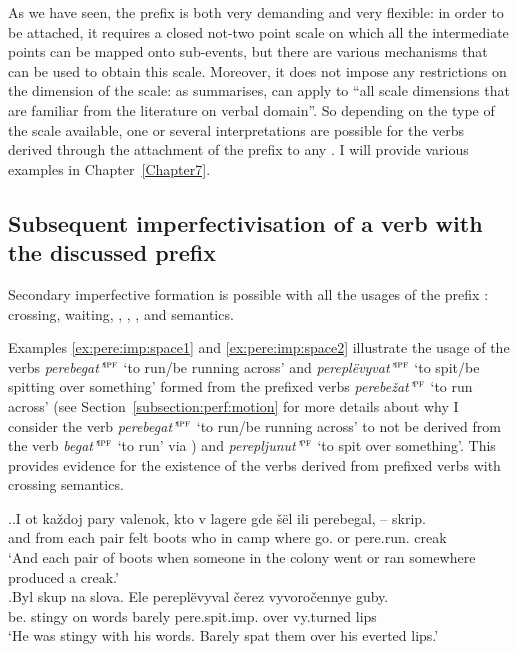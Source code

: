 As we have seen, the prefix  is both very demanding and very flexible: in order to be attached, it requires a closed not-two point scale on which all the intermediate points can be mapped onto sub-events, but there are various mechanisms that can be used to obtain this scale. Moreover, it does not impose any restrictions on the dimension of the scale: as \citet[151]{Kagan:book} summarises,  can apply to ``all scale dimensions that are familiar from the literature on verbal domain''. So depending on the type of the scale available, one or several interpretations are possible for the verbs derived through the attachment of the prefix  to any . I will provide various examples in Chapter~\ref{Chapter7}.

\subsection{Subsequent imperfectivisation of a verb with the discussed prefix}
Secondary imperfective formation is possible with all the usages of the prefix : crossing, waiting, , , , and  semantics.

Examples \ref{ex:pere:imp:space1} and \ref{ex:pere:imp:space2} illustrate the usage of the  verbs \textit{perebegat'}$^{\textsc{ipf}}$ `to run/be running across' and \textit{perepl\"{e}vyvat'}$^{\textsc{ipf}}$ `to spit/be spitting over something' formed from the prefixed verbs \textit{perebe\v{z}at'}$^{\textsc{pf}}$ `to run across' (see Section~\ref{subsection:perf:motion} for more details about why I consider the verb \textit{pe\-re\-be\-gat'}$^{\textsc{ipf}}$ `to run/be running across' to not be derived from the verb \textit{begat'}$^{\textsc{ipf}}$ `to run' via ) and \textit{perepljunut'}$^{\textsc{pf}}$ `to spit over something'. This provides evidence for the existence of the  verbs derived from prefixed verbs with crossing semantics.\largerpage[2]

\ex.\ag.\label{ex:pere:imp:space1}I ot ka\v{z}doj pary valenok, kto v lagere gde \v{s}\"{e}l ili perebegal, -- skrip.\\
and from each pair {felt boots} who in camp where go. or pere.run. {} creak\\
\trans `And each pair of boots when someone in the colony went or ran somewhere produced a creak.'\\
\bg.\label{ex:pere:imp:space2}Byl skup na slova. Ele perepl\"{e}vyval \v{c}erez vyvoro\v{c}ennye guby.\\
be. stingy on words barely pere.spit.imp. over vy.turned lips\\
\trans `He was stingy with his words. Barely spat them over his everted lips.'

